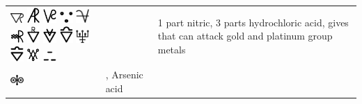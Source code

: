 \documentclass[british,final,landscape]{scrartcl}
\begin{document}
\begin{refsection}
\begin{supertabular}{p{0.3\textwidth}p{0.34\textwidth}p{0.34\textwidth}}
   \includegraphics[width=5mm]{Compounds/AquaRegia} \includegraphics[width=5mm]{Compounds/AquaRegia2} \includegraphics[width=5mm]{Compounds/AquaRegia3} \includegraphics[width=5mm]{Compounds/AquaRegia4} \includegraphics[width=5mm]{Compounds/AquaRegia5} \includegraphics[width=5mm]{Compounds/AquaRegia6} \includegraphics[width=5mm]{Compounds/AquaRegia7} \includegraphics[width=5mm]{Compounds/AquaRegia8} \includegraphics[width=5mm]{Compounds/AquaRegia9} \includegraphics[width=5mm]{Compounds/AquaRegia10} \includegraphics[width=5mm]{Compounds/AquaRegia11} \includegraphics[width=5mm]{Compounds/AquaRegia12} \includegraphics[width=5mm]{Compounds/AquaRegia13} &  &  1 part nitric, 3 parts hydrochloric acid, gives  that can attack gold and platinum group metals \\
   \includegraphics[width=5mm]{Compounds/ArsenicAcid} & , Arsenic acid &  \\

\end{supertabular}
\end{refsection}
\end{document}
